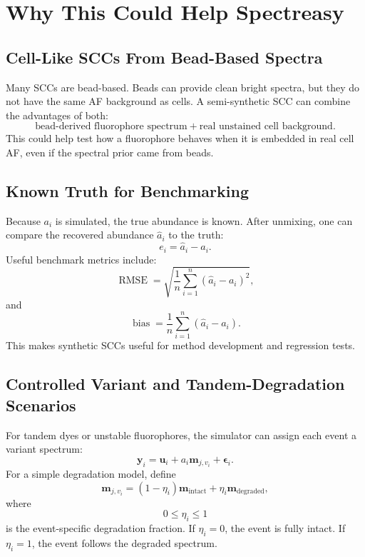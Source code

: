 \documentclass[11pt]{article}
\newcommand{\y}{\mathbf{y}}
\newcommand{\uvec}{\mathbf{u}}
\newcommand{\m}{\mathbf{m}}
\newcommand{\eps}{\boldsymbol{\epsilon}}
\begin{document}
\section{Why This Could Help Spectreasy}

\subsection{Cell-Like SCCs From Bead-Based Spectra}

Many SCCs are bead-based. Beads can provide clean bright spectra, but they do
not have the same AF background as cells. A semi-synthetic SCC can combine the
advantages of both:
\begin{equation}
  \text{bead-derived fluorophore spectrum}
  +
  \text{real unstained cell background}.
\end{equation}
This could help test how a fluorophore behaves when it is embedded in real cell
AF, even if the spectral prior came from beads.

\subsection{Known Truth for Benchmarking}

Because \(a_i\) is simulated, the true abundance is known. After unmixing, one
can compare the recovered abundance \(\hat{a}_i\) to the truth:
\begin{equation}
  e_i = \hat{a}_i - a_i.
\end{equation}
Useful benchmark metrics include:
\begin{equation}
  \operatorname{RMSE}
  =
  \sqrt{
    \frac{1}{n}
    \sum_{i=1}^{n}
    \left(
      \hat{a}_i - a_i
    \right)^2
  },
\end{equation}
and
\begin{equation}
  \operatorname{bias}
  =
  \frac{1}{n}
  \sum_{i=1}^{n}
  \left(
    \hat{a}_i - a_i
  \right).
\end{equation}
This makes synthetic SCCs useful for method development and regression tests.

\subsection{Controlled Variant and Tandem-Degradation Scenarios}

For tandem dyes or unstable fluorophores, the simulator can assign each event a
variant spectrum:
\begin{equation}
  \y_i
  =
  \uvec_i
  +
  a_i \m_{j,v_i}
  +
  \eps_i.
\end{equation}
For a simple degradation model, define
\begin{equation}
  \m_{j,v_i}
  =
  (1-\eta_i)\m_{\text{intact}}
  +
  \eta_i\m_{\text{degraded}},
\end{equation}
where
\begin{equation}
  0 \leq \eta_i \leq 1
\end{equation}
is the event-specific degradation fraction. If \(\eta_i = 0\), the event is
fully intact. If \(\eta_i = 1\), the event follows the degraded spectrum.
\end{document}
